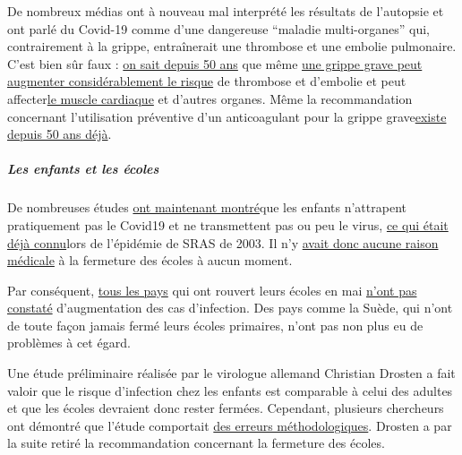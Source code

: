De nombreux médias ont à nouveau mal interprété les résultats de
l'autopsie et ont parlé du Covid-19 comme d'une dangereuse ``maladie
multi-organes'' qui, contrairement à la grippe, entraînerait une
thrombose et une embolie pulmonaire. C'est bien sûr faux :
\href{https://www.thieme-connect.com/products/ejournals/abstract/10.1055/s-0028-1108874}{on
sait depuis 50 ans} que même
\href{https://www.ejinme.com/article/S0953-6205(15)00284-8/pdf}{une
grippe grave peut augmenter considérablement le risque} de thrombose et
d'embolie et peut
affecter\href{https://academic.oup.com/ije/article-abstract/7/3/231/755276}{le
muscle cardiaque} et d'autres organes. Même la recommandation concernant
l'utilisation préventive d'un anticoagulant pour la grippe
grave\href{https://www.thieme-connect.com/products/ejournals/abstract/10.1055/s-0028-1108874}{existe
depuis 50 ans déjà}.

\hypertarget{les-enfants-et-les-uxe9coles}{%
\subparagraph{\texorpdfstring{\textbf{Les enfants et les
écoles}}{Les enfants et les écoles}}\label{les-enfants-et-les-uxe9coles}}

De nombreuses études
\href{https://thehill.com/opinion/education/500349-science-says-open-the-schools}{ont
maintenant montré}que les enfants n'attrapent pratiquement pas le
Covid19 et ne transmettent pas ou peu le virus,
\href{https://www.thelancet.com/journals/lanchi/article/PIIS2352-4642(20)30095-X/fulltext}{ce
qui était déjà connu}lors de l'épidémie de SRAS de 2003. Il n'y
\href{https://infekt.ch/2020/04/schulen-schliessen-hilfreich-oder-nicht/}{avait
donc aucune raison médicale} à la fermeture des écoles à aucun moment.

Par conséquent,
\href{https://www.reuters.com/article/us-health-coronavirus-denmark-reopening/opening-schools-in-denmark-did-not-worsen-outbreak-data-shows-idUSKBN2341N7}{tous
les pays} qui ont rouvert leurs écoles en mai
\href{https://www.cgdev.org/blog/back-school-tracking-covid-cases-schools-reopen}{n'ont
pas constaté} d'augmentation des cas d'infection. Des pays comme la
Suède, qui n'ont de toute façon jamais fermé leurs écoles primaires,
n'ont pas non plus eu de problèmes à cet égard.

Une étude préliminaire réalisée par le virologue allemand Christian
Drosten a fait valoir que le risque d'infection chez les enfants est
comparable à celui des adultes et que les écoles devraient donc rester
fermées. Cependant, plusieurs chercheurs ont démontré que l'étude
comportait
\href{https://www.nau.ch/news/europa/coronavirus-forscher-drangen-drosten-zum-ruckzug-der-kinder-studie-65714012}{des
erreurs méthodologiques}. Drosten a par la suite retiré la
recommandation concernant la fermeture des écoles.

